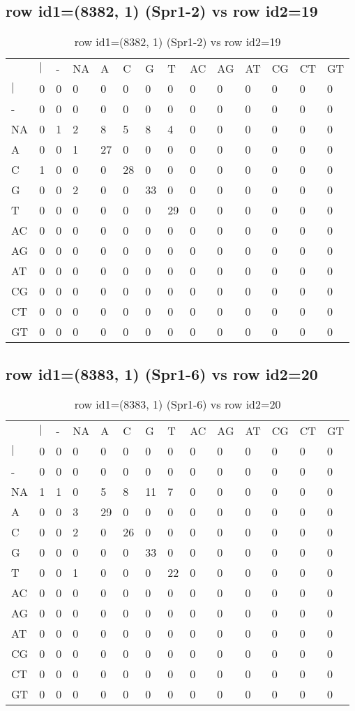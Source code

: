 \subsection{row id1=(8382, 1) (Spr1-2) vs row id2=19}
\begin{center}
\begin{longtable}{|l|l|l|l|l|l|l|l|l|l|l|l|l|l|}
\caption{row id1=(8382, 1) (Spr1-2) vs row id2=19} \label{table_dm432}\\
\hline
\\
\hline
&$|$&-&NA&A&C&G&T&AC&AG&AT&CG&CT&GT\\
$|$&0&0&0&0&0&0&0&0&0&0&0&0&0\\
-&0&0&0&0&0&0&0&0&0&0&0&0&0\\
NA&0&1&2&8&5&8&4&0&0&0&0&0&0\\
A&0&0&1&27&0&0&0&0&0&0&0&0&0\\
C&1&0&0&0&28&0&0&0&0&0&0&0&0\\
G&0&0&2&0&0&33&0&0&0&0&0&0&0\\
T&0&0&0&0&0&0&29&0&0&0&0&0&0\\
AC&0&0&0&0&0&0&0&0&0&0&0&0&0\\
AG&0&0&0&0&0&0&0&0&0&0&0&0&0\\
AT&0&0&0&0&0&0&0&0&0&0&0&0&0\\
CG&0&0&0&0&0&0&0&0&0&0&0&0&0\\
CT&0&0&0&0&0&0&0&0&0&0&0&0&0\\
GT&0&0&0&0&0&0&0&0&0&0&0&0&0\\
\hline
\end{longtable}
\end{center}

\subsection{row id1=(8383, 1) (Spr1-6) vs row id2=20}
\begin{center}
\begin{longtable}{|l|l|l|l|l|l|l|l|l|l|l|l|l|l|}
\caption{row id1=(8383, 1) (Spr1-6) vs row id2=20} \label{table_dm434}\\
\hline
\\
\hline
&$|$&-&NA&A&C&G&T&AC&AG&AT&CG&CT&GT\\
$|$&0&0&0&0&0&0&0&0&0&0&0&0&0\\
-&0&0&0&0&0&0&0&0&0&0&0&0&0\\
NA&1&1&0&5&8&11&7&0&0&0&0&0&0\\
A&0&0&3&29&0&0&0&0&0&0&0&0&0\\
C&0&0&2&0&26&0&0&0&0&0&0&0&0\\
G&0&0&0&0&0&33&0&0&0&0&0&0&0\\
T&0&0&1&0&0&0&22&0&0&0&0&0&0\\
AC&0&0&0&0&0&0&0&0&0&0&0&0&0\\
AG&0&0&0&0&0&0&0&0&0&0&0&0&0\\
AT&0&0&0&0&0&0&0&0&0&0&0&0&0\\
CG&0&0&0&0&0&0&0&0&0&0&0&0&0\\
CT&0&0&0&0&0&0&0&0&0&0&0&0&0\\
GT&0&0&0&0&0&0&0&0&0&0&0&0&0\\
\hline
\end{longtable}
\end{center}

